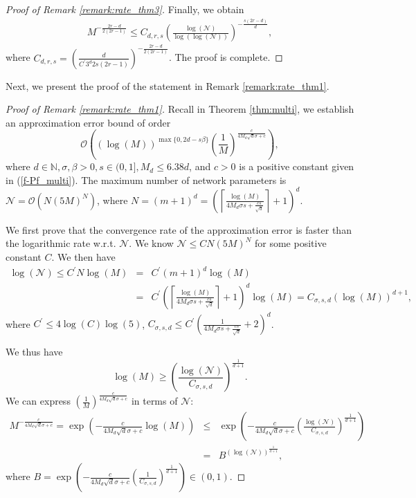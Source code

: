 \documentclass{article}
\def\NN{\mathbb N}
\numberwithin{equation}{section}
\begin{document}
\begin{appendices}
\begin{proof}[Proof of Remark \ref{remark:rate_thm3}]
Finally, we obtain
\begin{eqnarray*}
    M^{-\frac{2r-d}{2(2r-1)}} \leq C_{d,r,s}\left(\frac{\log (\mathcal{N})}{\log(\log(\mathcal{N}))}\right)^{-\frac{s(2r-d)}{d}}, 
\end{eqnarray*}
where $C_{d,r,s}= \left(\frac{d}{C^\prime3^d2s(2r-1)}\right)^{-\frac{2r-d}{2(2r-1)}}$. The proof is complete.
\end{proof}

Next, we present the proof of the statement in Remark \ref{remark:rate_thm1}.

\begin{proof}[Proof of Remark \ref{remark:rate_thm1}]
Recall in Theorem \ref{thm:multi}, we establish an approximation error bound of order $$\mathcal{O}\left((\log (M))^{\max\{0, 2d-s\beta\}}\left(\frac{1}{M}\right)^{\frac{c}{4M_d \sqrt{d}\sigma+c}}\right),$$ where $d \in \NN, \sigma, \beta >0, s \in (0,1], M_d \leq 6.38d$, and $c>0$ is a positive constant given in (\ref{f-Pf_multi}). The maximum number of network parameters is $\mathcal{N} = \mathcal{O}\left(N(5M)^N\right)$, where $N = (m+1)^d = \left(\left\lceil\frac{\log (M)}{4M_d\sigma s + \frac{cs}{\sqrt{d}}}\right\rceil +1\right)^d$.

We first prove that the convergence rate of the approximation error is faster than the logarithmic rate w.r.t. $\mathcal{N}$. 
We know $\mathcal{N} \leq C N (5M)^N$ for some positive constant $C$. We then have  
\begin{eqnarray}\label{logN}
    \log (\mathcal{N}) \leq C^\prime N \log (M) &=& C^\prime(m+1)^d  \log (M) \nonumber\\    &=&C^\prime\left(\left\lceil\frac{\log (M)}{4M_d\sigma s + \frac{cs}{\sqrt{d}}}\right\rceil + 1 \right)^d \log (M) 
    = C_{\sigma, s, d} (\log (M))^{d+1},
\end{eqnarray}
where $C^\prime \leq 4 \log (C) \log (5)$, $C_{\sigma, s, d}\leq C^\prime\left(\frac{1}{4M_d\sigma s + \frac{cs}{\sqrt{d}}}+2\right )^d$.

We thus have \begin{equation}\label{logM}
    \log (M) \geq \left(\frac{\log (\mathcal{N})}{C_{\sigma, s, d}}\right)^{\frac{1}{d+1}}.
\end{equation}
 We can express $\left(\frac{1}{M}\right)^{\frac{c}{4M_d \sqrt{d}\sigma+c}}$ in terms of $\mathcal{N}$:
\begin{eqnarray*}
    M^{-\frac{c}{4M_d \sqrt{d}\sigma+c}} = \exp\left(-\frac{c}{4M_d \sqrt{d}\sigma+c} \log (M)\right) &\leq& \exp\left(-\frac{c}{4M_d \sqrt{d}\sigma+c} \left(\frac{\log (\mathcal{N})}{C_{\sigma, s, d}}\right)^{\frac{1}{d+1}} \right) \\
    &=& B^{(\log (\mathcal{N}))^{\frac{1}{d+1}}},
\end{eqnarray*}
where $B = \exp\left(-\frac{c}{4M_d \sqrt{d}\sigma+c} \left(\frac{1}{C_{\sigma, s, d}}\right)^{\frac{1}{d+1}} \right) \in (0,1)$.


\end{proof}
\end{appendices}
\end{document}
